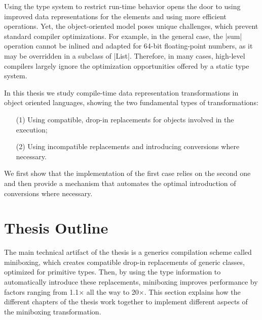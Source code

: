 Using the type system to restrict run-time behavior opens the door to using improved data representations for the elements and using more efficient operations. Yet, the object-oriented model poses unique challenges, which prevent standard compiler optimizations. For example, in the general case, the |sum| operation cannot be inlined and adapted for 64-bit floating-point numbers, as it may be overridden in a subclass of |List|. Therefore, in many cases, high-level compilers largely ignore the optimization opportunities offered by a static type system.


In this thesis we study compile-time data representation transformations in object oriented languages, showing the two fundamental types of transformations:

\vspace{-0.5em}
\begin{itemize}
  \item[(1)] Using compatible, drop-in replacements for objects involved in the execution;
  \item[(2)] Using incompatible replacements and introducing conversions where necessary.
\end{itemize}
\vspace{-0.5em}

We first show that the implementation of the first case relies on the second one and then provide a mechanism that automates the optimal introduction of conversions where necessary.

\section{Thesis Outline}

The main technical artifact of the thesis is a generics compilation scheme called miniboxing, which creates compatible drop-in replacements of generic classes, optimized for primitive types. Then, by using the type information to automatically introduce these replacements, miniboxing improves performance by factors ranging from 1.1$\times$ all the way to 20$\times$. This section explains how the different chapters of the thesis work together to implement different aspects of the miniboxing transformation.

